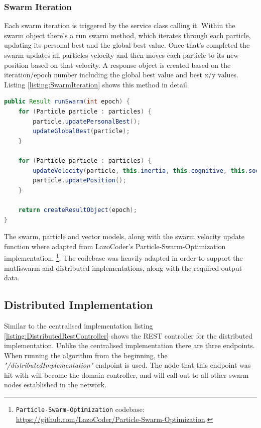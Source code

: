 \documentclass[oneside,12pt]{book}
\begin{document}
\subsubsection{Swarm Iteration}
Each swarm iteration is triggered by the service class calling it. Within the swarm object there's a run swarm method, which iterates through each particle, updating its personal best and the global best value. Once that's completed the swarm updates all particles velocity and then moves each particle to its new position based on that velocity. A response object is created based on the iteration/epoch number including the global best value and best x/y values. Listing \ref{listing:SwarmIteration} shows this method in detail. 
\begin{lstlisting}[basicstyle=\footnotesize, language=Java]
public Result runSwarm(int epoch) {
    for (Particle particle : particles) {
        particle.updatePersonalBest();
        updateGlobalBest(particle);
    }

    for (Particle particle : particles) {
        updateVelocity(particle, this.inertia, this.cognitive, this.social);
        particle.updatePosition();
    }

    return createResultObject(epoch);
}
\end{lstlisting}
\label{listing:SwarmIteration}

The swarm, particle and vector models, along with the swarm velocity update function where adapted from  LazoCoder's Particle-Swarm-Optimization implementation. \footnote{\texttt{Particle-Swarm-Optimization} codebase: \url{https://github.com/LazoCoder/Particle-Swarm-Optimization}.}. The codebase was heavily adapted in order to support the mutliswarm and distributed implementations, along with the required output data. 

\subsection{Distributed Implementation}
Similar to the centralised implementation listing \ref{listing:DistributedRestController} shows the REST controller for the distributed implementation. Unlike the centralised implementation there are three endpoints. When running the algorithm from the beginning, the \textit{"/distributedImplementation"} endpoint is used. The node that this endpoint was hit with will become the domain controller, and will call out to all other swarm nodes established in the network.
\end{document}
